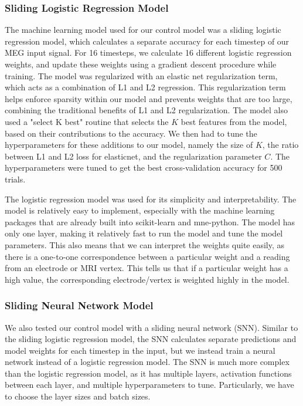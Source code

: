 \documentclass[../main.tex]{subfiles}
\begin{document}
\subsubsection{Sliding Logistic Regression Model}
The machine learning model used for our control model was a sliding logistic regression model, which calculates a separate accuracy for each timestep of our MEG input signal. For 16 timesteps, we calculate 16 different logistic regression weights, and update these weights using a gradient descent procedure while training. The model was regularized with an elastic net regularization term, which acts as a combination of L1 and L2 regression. This regularization term helps enforce sparsity within our model and prevents weights that are too large, combining the traditional benefits of L1 and L2 regularization. The model also used a "select K best" routine that selects the $K$ best features from the model, based on their contributions to the accuracy. We then had to tune the hyperparameters for these additions to our model, namely the size of $K$, the ratio between L1 and L2 loss for elasticnet, and the regularization parameter $C$. The hyperparameters were tuned to get the best cross-validation accuracy for 500 trials.


The logistic regression model was used for its simplicity and interpretability. The model is relatively easy to implement, especially with the machine learning packages that are already built into scikit-learn and mne-python. The model has only one layer, making it relatively fast to run the model and tune the model parameters. This also means that we can interpret the weights quite easily, as there is a one-to-one correspondence between a particular weight and a reading from an electrode or MRI vertex. This tells us that if a particular weight has a high value, the corresponding electrode/vertex is weighted highly in the model.

\subsubsection{Sliding Neural Network Model}
We also tested our control model with a sliding neural network (SNN). Similar to the sliding logistic regression model, the SNN calculates separate predictions and model weights for each timestep in the input, but we instead train a neural network instead of a logistic regression model. The SNN is much more complex than the logistic regression model, as it has multiple layers, activation functions between each layer, and multiple hyperparameters to tune. Particularly, we have to choose the layer sizes and batch sizes.
\end{document}
